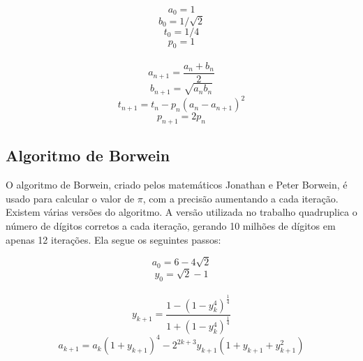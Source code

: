 \documentclass[a4paper]{article}
\begin{document}
\begin{displaymath}
	a_0 = 1
\end{displaymath}
\begin{displaymath}
	b_0 = 1 / \sqrt{2}
\end{displaymath}
\begin{displaymath}
	t_0 = 1 / 4
\end{displaymath}
\begin{displaymath}
	p_0 = 1
\end{displaymath}
\\
\begin{displaymath}
	a_{n+1} = \frac{a_n + b_n}{2}
\end{displaymath}
\begin{displaymath}
	b_{n+1} = \sqrt{a_{n}b_{n}}
\end{displaymath}
\begin{displaymath}
	t_{n+1} = t_n - p_{n}(a_n - a_{n+1})^2
\end{displaymath}
\begin{displaymath}
	p_{n+1} = 2p_n
\end{displaymath}

\subsection{Algoritmo de Borwein}
O algoritmo de Borwein, criado pelos matemáticos Jonathan e Peter Borwein, é 
usado para calcular o valor de \begin{math}\pi\end{math}, com a precisão aumentando a cada iteração.
Existem várias versões do algoritmo. A versão utilizada no trabalho quadruplica 
o número de dígitos corretos a cada iteração, gerando 10 milhões de dígitos em 
apenas 12 iterações. Ela segue os seguintes passos:

\begin{displaymath}
	a_0 = 6 - 4\sqrt{2}
\end{displaymath}
\begin{displaymath}
	y_0 = \sqrt{2} - 1
\end{displaymath}
\\
\begin{displaymath}
	y_{k+1} = \frac{1 - (1-y_k^4)^\frac{1}{4}}{1 + (1-y_k^4)^\frac{1}{4}}
\end{displaymath}
\begin{displaymath}
	a_{k+1} = a_k(1 + y_{k+1})^4 - 2^{2k+3}y_{k+1}(1 + y_{k+1} + y_{k+1}^2)
\end{displaymath}
\end{document}
